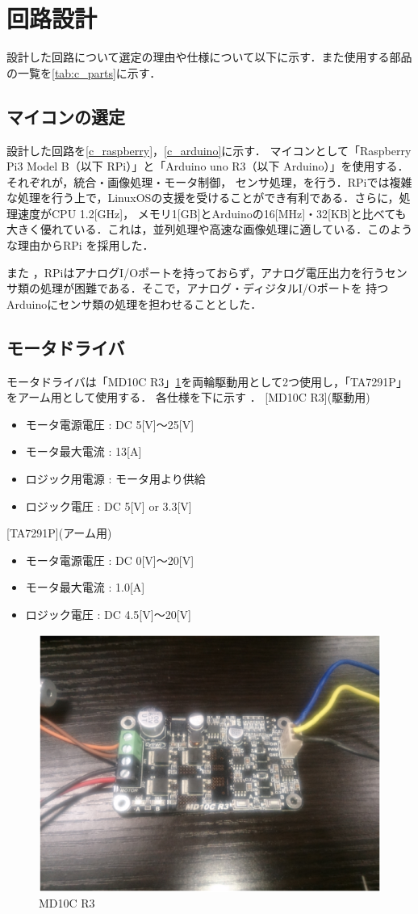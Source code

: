 \section{回路設計}
設計した回路について選定の理由や仕様について以下に示す．また使用する部品の一覧を\ref{tab:c_parts}に示す．
\subsection{マイコンの選定}
設計した回路を\ref{c_raspberry}，\ref{c_arduino}に示す．
マイコンとして「Raspberry Pi3 Model B（以下 RPi）」と「Arduino uno R3（以下 Arduino）」を使用する．それぞれが，統合・画像処理・モータ制御，
センサ処理，を行う．RPiでは複雑な処理を行う上で，LinuxOSの支援を受けることができ有利である．さらに，処理速度がCPU 1.2[GHz]，
メモリ1[GB]とArduinoの16[MHz]・32[KB]と比べても大きく優れている．これは，並列処理や高速な画像処理に適している．このような理由からRPi
を採用した．

また ，RPiはアナログI/Oポートを持っておらず，アナログ電圧出力を行うセンサ類の処理が困難である．そこで，アナログ・ディジタルI/Oポートを
持つArduinoにセンサ類の処理を担わせることとした．
\subsection{モータドライバ}
モータドライバは「MD10C R3」\ref{MD10C}を両輪駆動用として2つ使用し，「TA7291P」をアーム用として使用する．
各仕様を下に示す
．
[MD10C R3](駆動用)
\begin{itemize}
 \item モータ電源電圧 : DC 5[V]$〜$25[V]
 \item モータ最大電流 : 13[A]
 \item ロジック用電源 : モータ用より供給
 \item ロジック電圧   : DC 5[V] or 3.3[V]
\end{itemize}

[TA7291P](アーム用)
\begin{itemize}
 \item モータ電源電圧 : DC 0[V]$〜$20[V]
 \item モータ最大電流 : 1.0[A]
 \item ロジック電圧 : DC 4.5[V]$〜$20[V]
\end{itemize}
\begin{figure}[b]
 \centering
 \includegraphics[width=0.5\hsize]{../Circuit/picture/MD10C.eps}
    \caption{MD10C R3}
    \label{MD10C}
\end{figure}

